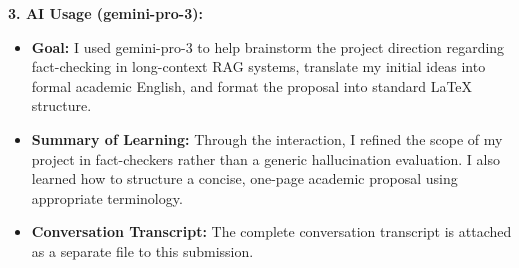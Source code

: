 \documentclass[12pt, letterpaper]{article}
\begin{document}
\textbf{3. AI Usage (gemini-pro-3):}
\begin{itemize}[leftmargin=*]
    \item \textbf{Goal:} I used gemini-pro-3 to help brainstorm the project direction regarding fact-checking in long-context RAG systems, translate my initial ideas into formal academic English, and format the proposal into standard LaTeX structure.
    \item \textbf{Summary of Learning:} Through the interaction, I refined the scope of my project in fact-checkers rather than a generic hallucination evaluation. I also learned how to structure a concise, one-page academic proposal using appropriate terminology.
    \item \textbf{Conversation Transcript:} The complete conversation transcript is attached as a separate file to this submission.
\end{itemize}
\end{document}
